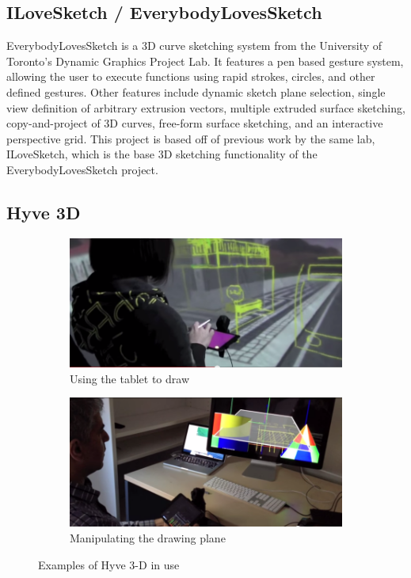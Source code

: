 \documentclass[11pt]{report}
\begin{document}
\subsection{ILoveSketch / EverybodyLovesSketch}

EverybodyLovesSketch is a 3D curve sketching system from the University of Toronto's Dynamic Graphics Project Lab. It features a pen based gesture system, allowing the user to execute functions using rapid strokes, circles, and other defined gestures. Other features include dynamic sketch plane selection, single view definition of arbitrary extrusion vectors, multiple extruded surface sketching, copy-and-project of 3D curves, free-form surface sketching, and an interactive perspective grid. This project is based off of previous work by the same lab, ILoveSketch, which is the base 3D sketching functionality of the EverybodyLovesSketch project.

\subsection{Hyve 3D}

\begin{figure}

\begin{subfigure}{\textwidth}
\includegraphics[width=0.9\linewidth]{Hyve3D1}
\caption{Using the tablet to draw}
\end{subfigure}
\begin{subfigure}{\textwidth}
\includegraphics[width=0.9\linewidth]{Hyve3D2}
\caption{Manipulating the drawing plane}
\end{subfigure}

\caption{Examples of Hyve 3-D in use}
\end{figure}
\end{document}

